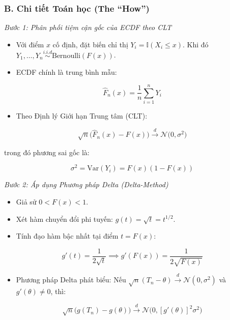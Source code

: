 \documentclass[12pt,a4paper]{article}
\begin{document}
\subsubsection{B. Chi tiết Toán học (The ``How'')}\label{b.-chi-tiux1ebft-touxe1n-hux1ecdc-the-how-2}

\emph{Bước 1: Phân phối tiệm cận gốc của ECDF theo CLT}

\begin{itemize}

\item
  Với điểm \(x\) cố định, đặt biến chỉ thị \(Y_i = \mathbb{I}(X_i \le x)\). Khi đó \(Y_1, \dots, Y_n \overset{i.i.d}{\sim} \text{Bernoulli}(F(x))\).
\item
  ECDF chính là trung bình mẫu:
\end{itemize}

\[\widehat{F}_n(x) = \frac{1}{n}\sum_{i=1}^n Y_i\]

\begin{itemize}

\item
  Theo Định lý Giới hạn Trung tâm (CLT):
\end{itemize}

\[\sqrt{n}\Big(\widehat{F}_n(x) - F(x)\Big) \xrightarrow{d} \mathcal{N}\Big(0, \sigma^2\Big)\]

trong đó phương sai gốc là:

\[\sigma^2 = \text{Var}(Y_i) = F(x)(1 - F(x))\]

\emph{Bước 2: Áp dụng Phương pháp Delta (Delta-Method)}

\begin{itemize}

\item
  Giả sử \(0 < F(x) < 1\).
\item
  Xét hàm chuyển đổi phi tuyến: \(g(t) = \sqrt{t} = t^{1/2}\).
\item
  Tính đạo hàm bậc nhất tại điểm \(t = F(x)\):
\end{itemize}

\[g'(t) = \frac{1}{2\sqrt{t}} \implies g'(F(x)) = \frac{1}{2\sqrt{F(x)}}\]

\begin{itemize}

\item
  Phương pháp Delta phát biểu: Nếu \(\sqrt{n}(T_n - \theta) \xrightarrow{d} \mathcal{N}(0, \sigma^2)\) và \(g'(\theta) \neq 0\), thì:
\end{itemize}

\[\sqrt{n}\Big(g(T_n) - g(\theta)\Big) \xrightarrow{d} \mathcal{N}\Big(0, [g'(\theta)]^2 \sigma^2\Big)\]
\end{document}
